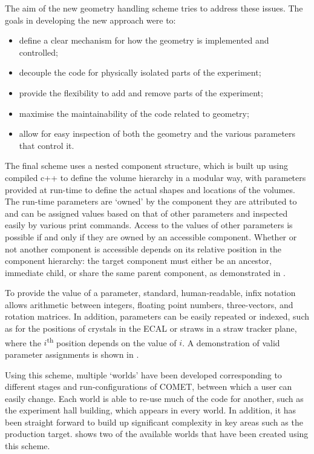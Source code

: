The aim of the new geometry handling scheme tries to address these issues.
The goals in developing the new approach were to:
\begin{itemize}
\setlength{\itemsep}{-1ex}
\item define a clear mechanism for how the geometry is implemented and controlled;
\item decouple the code for physically isolated parts of the experiment;
\item provide the flexibility to add and remove parts of the experiment;
\item maximise the maintainability of the code related to geometry;
\item allow for easy inspection of both the geometry and the various parameters that control it.
\end{itemize}

\FigGeometryHeirarchy

The final scheme uses a nested component structure, which is built up using compiled c++ to define the volume hierarchy in a modular way, with parameters provided at run-time to define the actual shapes and locations of the volumes.
The run-time parameters are `owned' by the component they are attributed to and can be assigned values based on that of other parameters and inspected easily by various print commands.
Access to the values of other parameters is possible if and only if they are owned by an accessible component.
Whether or not another component is accessible depends on its relative position in the component hierarchy: the target component must either be an ancestor, immediate child, or share the same parent component, as demonstrated in .

To provide the value of a parameter, standard, human-readable, infix notation allows arithmetic between integers, floating point numbers, three-vectors, and rotation matrices.
In addition, parameters can be easily repeated or indexed, such as for the positions of crystals in the ECAL or straws in a straw tracker plane, where the $i$\textsuperscript{th} position depends on the value of $i$.
A demonstration of valid parameter assignments is shown in .

\FigGeometryParameters
\FigGeometryScreenshots

Using this scheme, multiple `worlds' have been developed corresponding to different stages and run-configurations of COMET, between which a user can easily change.
Each world is able to re-use much of the code for another, such as the experiment hall building, which appears in every world.
In addition, it has been straight forward to build up significant complexity in key areas such as the production target.
 shows two of the available worlds that have been created using this scheme.

